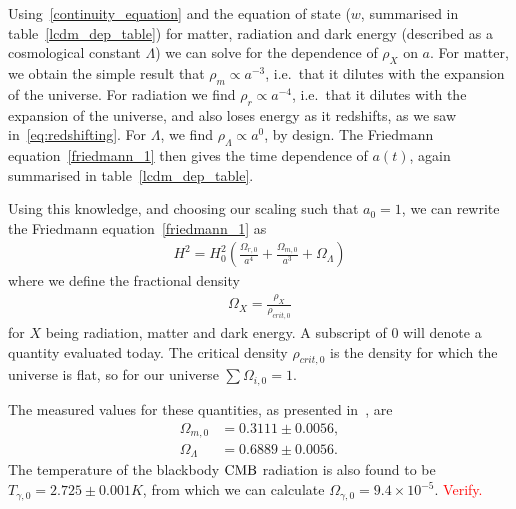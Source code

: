     Using~\eqref{continuity_equation} and the equation of state ($w$, summarised in table~\ref{lcdm_dep_table})
    for matter, radiation and dark energy (described as a cosmological constant $\Lambda$)
    we can solve for the dependence of $\rho_X$ on $a$.
    For matter, we obtain the simple result that $\rho_m\propto a^{-3}$,
    i.e.\ that it dilutes with the expansion of the universe.
    For radiation we find $\rho_r\propto a^{-4}$,
    i.e.\ that it dilutes with the expansion of the universe,
    and also loses energy as it redshifts, as we
    saw in~\eqref{eq:redshifting}.
    For $\Lambda$, we find $\rho_\Lambda\propto a^0$, by design.
    The Friedmann equation~\eqref{friedmann_1} then gives the time dependence of
    $a(t)$, again summarised in table~\ref{lcdm_dep_table}.


    Using this knowledge,
    and choosing our scaling such that $a_0=1$,
    we can rewrite the Friedmann equation~\eqref{friedmann_1} as
    \begin{align}\label{friedmann_omega}
        H^2 = H_0^2\left(\frac{\Omega_{r,0}}{a^4}+\frac{\Omega_{m,0}}{a^3}+\Omega_{\Lambda}\right)
    \end{align}
    where we define the fractional density
    \begin{align}
        \Omega_{X} = \frac{\rho_X}{\rho_{crit,0}}
    \end{align}
    for $X$ being radiation, matter and dark energy.
    A subscript of $0$ will denote a quantity evaluated today.
    The critical density $\rho_{crit,0}$ is the density for which the universe is flat,
    so for our universe $\sum\Omega_{i,0}=1$.


    The measured values for these quantities, as presented in~\cite{Planck_parameters_2018},
    are
    \begin{align}\label{measured_params}
        \Omega_{m,0} &= 0.3111 \pm 0.0056,\\
        \Omega_{\Lambda} &=  0.6889 \pm 0.0056.
    \end{align}
    The temperature of the blackbody $\text{CMB}$ radiation is
    also found to be $T_{\gamma,0}=2.725\pm0.001K$, from which
    we can calculate $\Omega_{\gamma,0}=9.4\times10^{-5}$.
    \textcolor{red}{Verify.}


